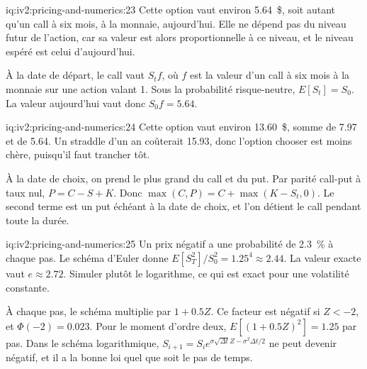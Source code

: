 \begin{solution}{iq:iv2:pricing-and-numerics:23}
Cette option vaut environ 5.64~\$, soit autant qu'un call à six mois, à la monnaie, aujourd'hui. Elle ne dépend pas du niveau futur de l'action, car sa valeur est alors proportionnelle à ce niveau, et le niveau espéré est celui d'aujourd'hui.

À la date de départ, le call vaut $S_tf$, où $f$ est la valeur d'un call à six mois à la monnaie sur une action valant 1. Sous la probabilité risque-neutre, $E[S_t] = S_0$. La valeur aujourd'hui vaut donc $S_0f = 5.64$.

\end{solution}

\begin{solution}{iq:iv2:pricing-and-numerics:24}
Cette option vaut environ 13.60~\$, somme de 7.97 et de 5.64. Un straddle d'un an coûterait 15.93, donc l'option chooser est moins chère, puisqu'il faut trancher tôt.

À la date de choix, on prend le plus grand du call et du put. Par parité call-put à taux nul, $P = C - S + K$. Donc $\max(C, P) = C + \max(K - S_t, 0)$. Le second terme est un put échéant à la date de choix, et l'on détient le call pendant toute la durée.

\end{solution}

\begin{solution}{iq:iv2:pricing-and-numerics:25}
Un prix négatif a une probabilité de 2.3~\% à chaque pas. Le schéma d'Euler donne $E[S_T^2]/S_0^2 = 1.25^4 \approx 2.44$. La valeur exacte vaut $e \approx 2.72$. Simuler plutôt le logarithme, ce qui est exact pour une volatilité constante.

À chaque pas, le schéma multiplie par $1 + 0.5Z$. Ce facteur est négatif si $Z < -2$, et $\Phi(-2) = 0.023$. Pour le moment d'ordre deux, $E[(1 + 0.5Z)^2] = 1.25$ par pas. Dans le schéma logarithmique, $S_{i+1} = S_ie^{\sigma\sqrt{\Delta t}Z - \sigma^2\Delta t/2}$ ne peut devenir négatif, et il a la bonne loi quel que soit le pas de temps.

\end{solution}

